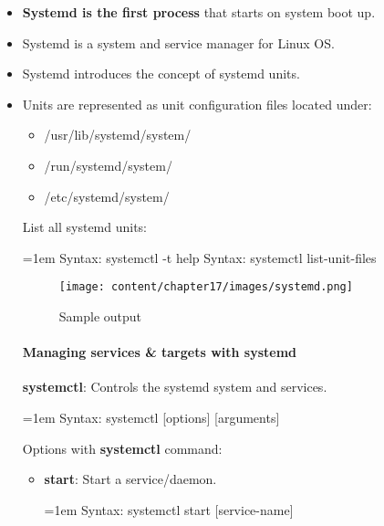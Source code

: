 \setlength{\columnsep}{3pt}
\begin{flushleft}
\bigskip

\begin{itemize}
	\item \textbf{Systemd is the first process} that starts on system boot up.
	\item Systemd is a system and service manager for Linux OS.
	\item Systemd introduces the concept of systemd units. 
	\item Units are represented as unit configuration files located under:
	\begin{itemize}
		\item /usr/lib/systemd/system/
		\item /run/systemd/system/
		\item /etc/systemd/system/
	\end{itemize}
	\bigskip
	List all systemd units:
	\bigskip
	\begin{tcolorbox}[breakable,notitle,boxrule=0pt,colback=pink,colframe=pink]
		\color{black}
		\font=1em
		Syntax: systemctl -t help
		\newline
		Syntax: systemctl list-unit-files
		\font=4pt
	\end{tcolorbox}

	\begin{figure}[h!]
		\centering
		\texttt{[image: content/chapter17/images/systemd.png]}
		\caption{Sample output}
		\label{fig:cpu256}
	\end{figure}
	
\newpage
	
	\paragraph{Managing services \& targets with systemd}

	\textbf{systemctl}: Controls the systemd system and services.

	\bigskip
	\begin{tcolorbox}[breakable,notitle,boxrule=0pt,colback=pink,colframe=pink]
		\color{black}
		\font=1em
		Syntax: systemctl [options] [arguments]
		\font=4pt
	\end{tcolorbox}
	\bigskip
	
	Options with \textbf{systemctl} command:
	\begin{itemize}
		\item \textbf{start}: Start a service/daemon.	 
		\bigskip
		\begin{tcolorbox}[breakable,notitle,boxrule=0pt,colback=pink,colframe=pink]
			\color{black}
			\font=1em
			Syntax: systemctl start [service-name]
			\font=4pt
		\end{tcolorbox}
		

\end{itemize}
\end{itemize}
\end{flushleft}
